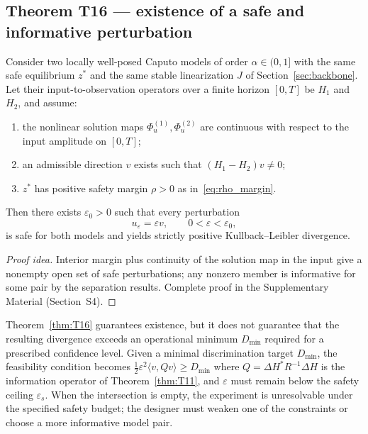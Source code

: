 \subsection{Theorem T16 --- existence of a safe and informative perturbation}

\begin{theorem}
\label{thm:T16}
Consider two locally well-posed Caputo models of order \(\alpha \in (0, 1]\) with the same safe equilibrium \(z^*\) and the same stable linearization \(J\) of Section~\ref{sec:backbone}. Let their input-to-observation operators over a finite horizon \([0, T]\) be \(H_1\) and \(H_2\), and assume:
\begin{enumerate}
\item[(i)] the nonlinear solution maps \(\Phi_{u}^{(1)}, \Phi_{u}^{(2)}\) are continuous with respect to the input amplitude on \([0, T]\);
\item[(ii)] an admissible direction \(v\) exists such that \((H_1 - H_2)v \neq 0\);
\item[(iii)] \(z^*\) has positive safety margin \(\rho > 0\) as in~\eqref{eq:rho_margin}.
\end{enumerate}
Then there exists \(\varepsilon_0 > 0\) such that every perturbation
\begin{equation}
u_{\varepsilon} = \varepsilon v, \qquad 0 < \varepsilon < \varepsilon_0,
\label{eq:scaled_pert}
\end{equation}
is safe for both models and yields strictly positive Kullback--Leibler divergence.
\end{theorem}

\begin{proof}[Proof idea]
Interior margin plus continuity of the solution map in the input give a nonempty open set of safe perturbations; any nonzero member is informative for some pair by the separation results. Complete proof in the Supplementary Material (Section~S4).
\end{proof}

\begin{remark}
Theorem~\ref{thm:T16} guarantees existence, but it does not guarantee that the resulting divergence exceeds an operational minimum \(D_{\min}\) required for a prescribed confidence level. Given a minimal discrimination target \(D_{\min}\), the feasibility condition becomes \(\tfrac{1}{2} \varepsilon^2 \langle v, Q v \rangle \ge D_{\min}\) where \(Q = \Delta H^{*} R^{-1} \Delta H\) is the information operator of Theorem~\ref{thm:T11}, and \(\varepsilon\) must remain below the safety ceiling \(\varepsilon_s\). When the intersection is empty, the experiment is unresolvable under the specified safety budget; the designer must weaken one of the constraints or choose a more informative model pair.
\end{remark}

